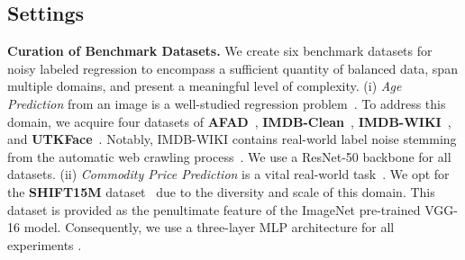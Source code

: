 \documentclass{article}
\theoremstyle{plain}
\theoremstyle{definition}
\theoremstyle{remark}
\begin{document}
\subsection{Settings}
\label{subsec:experiment_settings}
\textbf{Curation of Benchmark Datasets.}
We create six benchmark datasets for noisy labeled regression to encompass a sufficient quantity of balanced data, span multiple domains, and present a meaningful level of complexity. %
(i) \textit{Age Prediction} from an image is a well-studied regression problem~\citep{li19bridge, shin2022moving,lim20order}. 
To address this domain, we acquire four datasets of \textbf{AFAD}~\citep{niu16afad}, \textbf{IMDB-Clean}~\citep{lin2021imdbclean}, \textbf{IMDB-WIKI}~\citep{rothe18imdb}, and \textbf{UTKFace}~\citep{zhifei2017utkface}.
Notably, IMDB-WIKI contains real-world label noise stemming from the automatic web crawling process~\citep{lin2021imdbclean}.
We use a ResNet-50 backbone for all datasets. %
(ii) \textit{Commodity Price Prediction} is a vital real-world task~\citep{wen2021fashion}.
We opt for the \textbf{SHIFT15M} dataset~\citep{kimura21shift15m} due to the diversity and scale of this domain.
This dataset is provided as the penultimate feature of the ImageNet pre-trained VGG-16 model. 
Consequently, we use a three-layer MLP architecture for all experiments \citep{papadopoulos22fashion,kimura21shift15m}.
\end{document}

